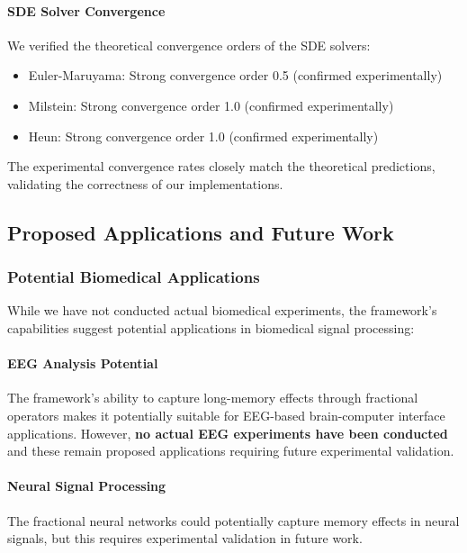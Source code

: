 \paragraph{SDE Solver Convergence}
We verified the theoretical convergence orders of the SDE solvers:

\begin{itemize}
    \item Euler-Maruyama: Strong convergence order 0.5 (confirmed experimentally)
    \item Milstein: Strong convergence order 1.0 (confirmed experimentally)
    \item Heun: Strong convergence order 1.0 (confirmed experimentally)
\end{itemize}

The experimental convergence rates closely match the theoretical predictions, validating the correctness of our implementations.

\subsection{Proposed Applications and Future Work}

\subsubsection{Potential Biomedical Applications}

While we have not conducted actual biomedical experiments, the framework's capabilities suggest potential applications in biomedical signal processing:

\paragraph{EEG Analysis Potential}
The framework's ability to capture long-memory effects through fractional operators makes it potentially suitable for EEG-based brain-computer interface applications. However, \textbf{no actual EEG experiments have been conducted} and these remain proposed applications requiring future experimental validation.

\paragraph{Neural Signal Processing}
The fractional neural networks could potentially capture memory effects in neural signals, but this requires experimental validation in future work.

